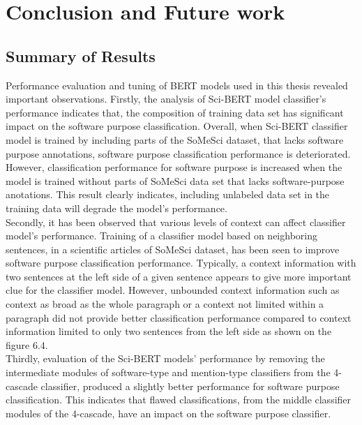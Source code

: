 \chapter{Conclusion and Future work}
\label{ch:chapter07}
 
%
%

\section{Summary of Results }
\label{sec:chapter06:summary}

Performance evaluation and tuning of BERT models used in this thesis revealed important observations. Firstly, the analysis of Sci-BERT model classifier's performance indicates that, the composition of training data set has significant impact on the software purpose classification. Overall, when Sci-BERT classifier model is trained by including parts of the SoMeSci dataset, that lacks software purpose annotations, software purpose classification performance is deteriorated. However, classification performance for software purpose is increased when the model is trained without parts of SoMeSci data set that lacks software-purpose anotations. This result clearly indicates, including unlabeled data set in the training data will degrade the model's performance.  \\

Secondly, it has been observed that various levels of context can affect classifier model's performance. Training of a classifier model based on neighboring sentences, in a scientific articles of SoMeSci dataset, has been seen to improve software purpose classification performance. Typically, a context information with two sentences at the left side of a given sentence appears to give more important clue for the classifier model. However, unbounded context information such as context as broad as the whole paragraph or a context not limited within a paragraph did not provide better classification performance compared to context information limited to only two sentences from the left side as shown on the figure 6.4. \\


Thirdly, evaluation of the Sci-BERT models' performance by removing the intermediate modules of software-type and mention-type classifiers from the 4-cascade classifier, produced a slightly better performance for software purpose classification.  This indicates that flawed classifications, from the middle classifier modules of the 4-cascade, have an impact on the software purpose classifier. \\

